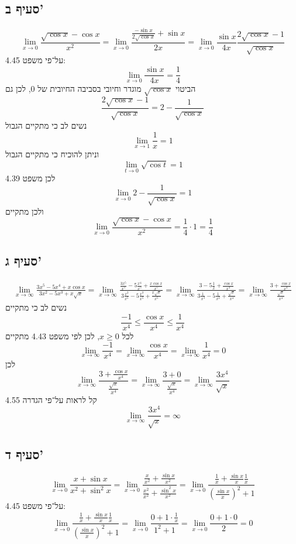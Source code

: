 \documentclass[a4paper]{article}
\begin{document}
\subsection{סעיף ב'}
\[
	\lim_{x \to 0} \frac{\sqrt{\cos x} - \cos x}{x^2}
	= \lim_{x \to 0} \frac{\frac{-\sin x}{2\sqrt{\cos x}} + \sin x}{2x}
	= \lim_{x \to 0} \frac{\sin x}{4x} \frac{2\sqrt{\cos x} - 1}{\sqrt{\cos x}}
\]
על־פי משפט 4.45:
\[
	\lim_{x \to 0} \frac{\sin x}{4 x} = \frac{1}{4}
\]
הביטוי $\sqrt{\cos x}$ מוגדר וחיובי בסביבה החיובית של $0$, לכן גם
\[
	\frac{2\sqrt{\cos x} - 1}{\sqrt{\cos x}} = 2 - \frac{1}{\sqrt{\cos x}}
\]
נשים לב כי מתקיים הגבול
\[
	\lim_{x \to 1} \frac{1}{x} = 1
\]
וניתן להוכיח כי מתקיים הגבול
\[
	\lim_{t \to 0} \sqrt{\cos t} = 1
\]
לכן משפט 4.39
\[
	\lim_{x \to 0} 2 - \frac{1}{\sqrt{\cos x}} = 1
\]
ולכן מתקיים
\[
	\lim_{x \to 0} \frac{\sqrt{\cos x} - \cos x}{x^2}
	= \frac{1}{4} \cdot 1 = \frac{1}{4}
\]

\subsection{סעיף ג'}
\begin{align*}
	\lim_{x \to \infty} \frac{3x^5 - 5x^4 + x \cos x}{3x^2 - 5x^3 + x\sqrt{x}}
	= \lim_{x \to \infty} \frac{\frac{3x^5}{x^5} - 5\frac{x^4}{x^5} + \frac{x \cos x}{x^5}}{3\frac{x^2}{x^5} - 5\frac{x^3}{x^5} + \frac{x\sqrt{x}}{x^5}}
	= \lim_{x \to \infty} \frac{3 - 5\frac{1}{x} + \frac{\cos x}{x^4}}{3\frac{1}{x^3} - 5\frac{1}{x^2} + \frac{\sqrt{x}}{x^4}}
	= \lim_{x \to \infty} \frac{3 + \frac{\cos x}{x^4}}{\frac{\sqrt{x}}{x^4}}
\end{align*}
נשים לב כי מתקיים
\[
	\frac{-1}{x^4} \le \frac{\cos x}{x^4} \le \frac{1}{x^4}
\]
לכל $x \ge 0$, לכן לפי משפט 4.43 מתקיים
\[
	\lim_{x \to \infty} \frac{-1}{x^4} = \lim_{x \to \infty} \frac{\cos x}{x^4} = \lim_{x \to \infty} \frac{1}{x^4} = 0
\]
לכן
\[
	\lim_{x \to \infty} \frac{3 + \frac{\cos x}{x^4}}{\frac{\sqrt{x}}{x^4}}
	= \lim_{x \to \infty} \frac{3 + 0}{\frac{\sqrt{x}}{x^4}}
	= \lim_{x \to \infty} \frac{3x^4}{\sqrt{x}}
\]
קל לראות על־פי הגדרה 4.55
\[
	\lim_{x \to \infty} \frac{3x^4}{\sqrt{x}} = \infty
\]

\subsection{סעיף ד'}
\[
	\lim_{x \to 0} \frac{x + \sin x}{x^2 + \sin^2 x}
	= \lim_{x \to 0} \frac{\frac{x}{x^2} + \frac{\sin x}{x^2}}{\frac{x^2}{x^2} + \frac{\sin^2 x}{x^2}}
	= \lim_{x \to 0} \frac{\frac{1}{x} + \frac{\sin x}{x}\frac{1}{x}}{{(\frac{\sin x}{x})}^2 + 1}
\]
על־פי משפט 4.45:
\[
	\lim_{x \to 0} \frac{\frac{1}{x} + \frac{\sin x}{x}\frac{1}{x}}{{(\frac{\sin x}{x})}^2 + 1}
	= \lim_{x \to 0} \frac{0 + 1 \cdot \frac{1}{x}}
	{1^2 + 1}
	= \lim_{x \to 0} \frac{0 + 1 \cdot 0}{2}
	= 0
\]
\end{document}
